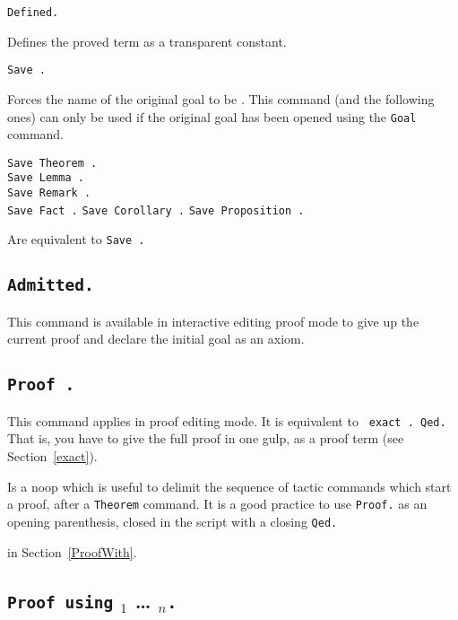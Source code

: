 \begin{Variants}

\item {\tt Defined.}
\label{Defined} 

  Defines the proved term as a transparent constant.

\item {\tt Save {\ident}.}
  
  Forces the name of the original goal to be {\ident}.  This command
  (and the following ones) can only be used if the original goal has
  been opened using the {\tt Goal} command.

\item {\tt Save Theorem {\ident}.} \\
 {\tt Save Lemma {\ident}.} \\
 {\tt Save Remark {\ident}.}\\
 {\tt Save Fact {\ident}.}
 {\tt Save Corollary {\ident}.}
 {\tt Save Proposition {\ident}.}

  Are equivalent to {\tt Save {\ident}.} 
\end{Variants}

\subsection[\tt Admitted.]{\tt Admitted.\label{Admitted}}
This command is available in interactive editing proof mode to give up
the current proof and declare the initial goal as an axiom.

\subsection[\tt Proof {\term}.]{\tt Proof {\term}.
\label{BeginProof}}
This command applies in proof editing mode. It is equivalent to {\tt
  exact {\term}. Qed.} That is, you have to give the full proof in
one gulp, as a proof term (see Section~\ref{exact}).

  
  Is a noop which is useful to delimit the sequence of tactic commands
  which start a proof, after a {\tt Theorem} command.  It is a good
  practice to use {\tt Proof.} as an opening parenthesis, closed in
  the script with a closing {\tt Qed.}

 in Section~\ref{ProofWith}.

\subsection[{\tt Proof using} {\ident$_1$} {\ldots} {\ident$_n$}{\tt .}]
{{\tt Proof using} {\ident$_1$} {\ldots} {\ident$_n$}{\tt .}
 \label{ProofUsing}}

